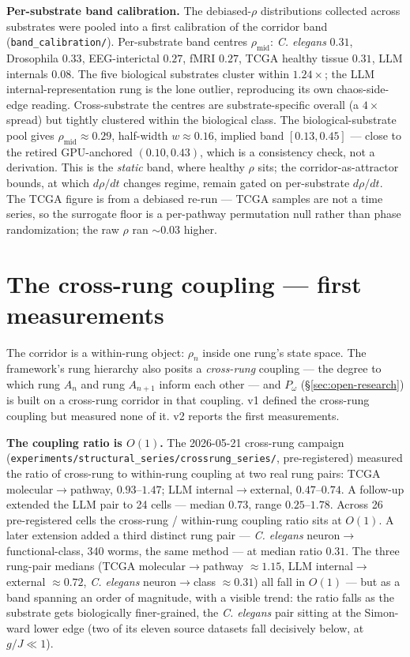 \documentclass[11pt,a4paper]{article}
\newcommand{\Pomega}{P_{\omega}}
\begin{document}
\textbf{Per-substrate band calibration.} The debiased-$\rho$ distributions collected across substrates were pooled into a first calibration of the corridor band (\texttt{band\_calibration/}). Per-substrate band centres $\rho_{\text{mid}}$: \emph{C. elegans} $0.31$, Drosophila $0.33$, EEG-interictal $0.27$, fMRI $0.27$, TCGA healthy tissue $0.31$, LLM internals $0.08$. The five biological substrates cluster within $1.24\times$; the LLM internal-representation rung is the lone outlier, reproducing its own chaos-side-edge reading. Cross-substrate the centres are substrate-specific overall (a $4\times$ spread) but tightly clustered within the biological class. The biological-substrate pool gives $\rho_{\text{mid}} \approx 0.29$, half-width $w \approx 0.16$, implied band $[0.13, 0.45]$ --- close to the retired GPU-anchored $(0.10, 0.43)$, which is a consistency check, not a derivation. This is the \emph{static} band, where healthy $\rho$ sits; the corridor-as-attractor bounds, at which $d\rho/dt$ changes regime, remain gated on per-substrate $d\rho/dt$. The TCGA figure is from a debiased re-run --- TCGA samples are not a time series, so the surrogate floor is a per-pathway permutation null rather than phase randomization; the raw $\rho$ ran $\sim 0.03$ higher.

\section{The cross-rung coupling --- first measurements}\label{sec:crossrung}

The corridor is a within-rung object: $\rho_n$ inside one rung's state space. The framework's rung hierarchy also posits a \emph{cross-rung} coupling --- the degree to which rung $A_n$ and rung $A_{n+1}$ inform each other --- and $\Pomega$ (\S\ref{sec:open-research}) is built on a cross-rung corridor in that coupling. v1 defined the cross-rung coupling but measured none of it. v2 reports the first measurements.

\textbf{The coupling ratio is $O(1)$.} The 2026-05-21 cross-rung campaign (\texttt{experiments/structural\_series/crossrung\_series/}, pre-registered) measured the ratio of cross-rung to within-rung coupling at two real rung pairs: TCGA molecular$\to$pathway, $0.93$--$1.47$; LLM internal$\to$external, $0.47$--$0.74$. A follow-up extended the LLM pair to 24 cells --- median $0.73$, range $0.25$--$1.78$. Across 26 pre-registered cells the cross-rung / within-rung coupling ratio sits at $O(1)$. A later extension added a third distinct rung pair --- \emph{C. elegans} neuron$\to$functional-class, 340 worms, the same method --- at median ratio $0.31$. The three rung-pair medians (TCGA molecular$\to$pathway $\approx 1.15$, LLM internal$\to$external $\approx 0.72$, \emph{C. elegans} neuron$\to$class $\approx 0.31$) all fall in $O(1)$ --- but as a band spanning an order of magnitude, with a visible trend: the ratio falls as the substrate gets biologically finer-grained, the \emph{C. elegans} pair sitting at the Simon-ward lower edge (two of its eleven source datasets fall decisively below, at $g/J \ll 1$).
\end{document}
